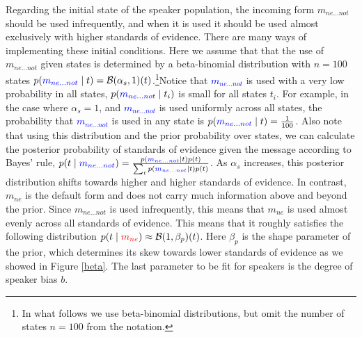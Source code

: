 \documentclass[linguex]{sp}
\theoremstyle{definition} \newtheorem{definition}{Definition}
\begin{document}
Regarding the initial state of the speaker population, the incoming form \textit{\color{blue} $m_{ne...not}$} should be used infrequently, and when it is used it should be used almost exclusively with higher standards of evidence. There are many ways of implementing these initial conditions. Here we assume that that the use of  \textit{\color{blue} $m_{ne...not}$} given states is determined by a beta-binomial distribution with $n=100$ states $p(\textcolor{blue}{m_{ne...not}} \mid t ) = \mathcal{B}(\alpha_{s}, 1)(t)$.\footnote{In what follows we use beta-binomial distributions, but omit the number of states $n=100$ from the notation.}Notice that \textcolor{blue}{$m_{ne...not}$} is used with a very low probability in all states, $p(\textcolor{blue}{m_{ne...not}} \mid t_i)$ is small for all states $t_i$. For example, in the case where $\alpha_s = 1$, and \textcolor{blue}{$m_{ne...not}$} is used uniformly across all states, the probability that \textcolor{blue}{$m_{ne...not}$} is used in any state is $p(\textcolor{blue}{m_{ne...not}} \mid t) = \frac{1}{100}$. Also note that using this distribution and the prior probability over states, we can calculate the posterior probability of standards of evidence given the message according to Bayes' rule, $p(t \mid \textcolor{blue}{m_{ne...not}}) = \frac{p(\textcolor{blue}{m_{ne...not}} \mid t ) p(t)}{\sum_t p(\textcolor{blue}{m_{ne...not}} \mid t ) p(t)}$. As $\alpha_{s}$ increases, this posterior distribution shifts towards higher and higher standards of evidence. In contrast, \textit{\color{red} $m_{ne}$} is the default form and does not carry much information above and beyond the prior. Since \textit{\color{blue} $m_{ne...not}$} is used infrequently, this means that \textit{\color{red} $m_{ne}$} is used almost evenly across all standards of evidence. This means that it roughly satisfies the following distribution $p(t \mid \textit{\color{red} $m_{ne}$}) \approx \mathcal B (1, \beta_p)(t)$. Here $\beta_p$ is the shape parameter of the prior, which determines its skew towards lower standards of evidence as we showed in Figure \ref{beta}. The last parameter to be fit for speakers is the degree of speaker bias $b$. 
\end{document}

